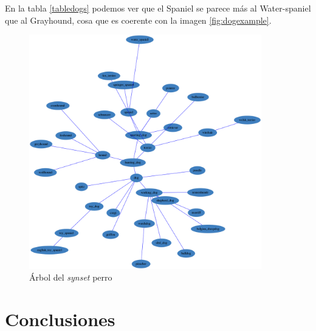 \documentclass[12,twoside]{TFG-GM}
\theoremstyle{definition}
\theoremstyle{remark}
\begin{document}
En la tabla \ref{tabledogs} podemos ver que el Spaniel se parece más al Water-spaniel que al Grayhound, cosa que es coerente con la imagen \ref{fig:dogexample}. 
 

 \begin{figure}[H] 
	\centering
	\includegraphics[width=0.9\textwidth] {Images/forest/dog.png}
	\caption{ Árbol del \textit{synset} perro
	\label{fig:grafoperro}}
\end{figure}


\section{Conclusiones}


\end{document}
